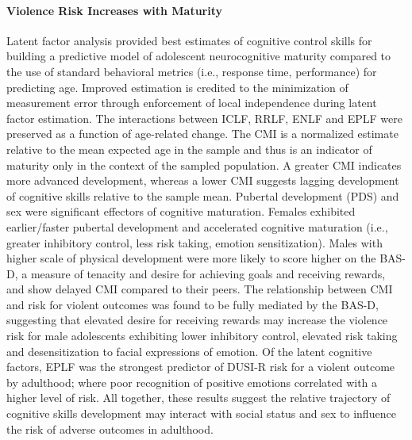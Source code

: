\documentclass[utf8]{stylesheet}
\begin{document}
\paragraph*{Violence Risk Increases with Maturity}
Latent factor analysis provided best estimates of cognitive control skills for building a predictive model of adolescent neurocognitive maturity compared to the use of standard behavioral metrics (i.e., response time, performance) for predicting age. Improved estimation is credited to the minimization of measurement error through enforcement of local independence during latent factor estimation. The interactions between ICLF, RRLF, ENLF and EPLF were preserved as a function of age-related change. The CMI is a normalized estimate relative to the mean expected age in the sample and thus is an indicator of maturity only in the context of the sampled population. A greater CMI indicates more advanced development, whereas a lower CMI suggests lagging development of cognitive skills relative to the sample mean. Pubertal development (PDS) and sex were significant effectors of cognitive maturation. Females exhibited earlier/faster pubertal development and accelerated cognitive maturation (i.e., greater inhibitory control, less risk taking, emotion sensitization). Males with higher scale of physical development were more likely to score higher on the BAS-D, a measure of tenacity and desire for achieving goals and receiving rewards, and show delayed CMI compared to their peers. The relationship between CMI and risk for violent outcomes was found to be fully mediated by the BAS-D, suggesting that elevated desire for receiving rewards may increase the violence risk for male adolescents exhibiting lower inhibitory control, elevated risk taking and desensitization to facial expressions of emotion. Of the latent cognitive factors, EPLF was the strongest predictor of DUSI-R risk for a violent outcome by adulthood; where poor recognition of positive emotions correlated with a higher level of risk. All together, these results suggest the relative trajectory of cognitive skills development may interact with social status and sex to influence the risk of adverse outcomes in adulthood. 
\vspace{2pt}
\end{document}
